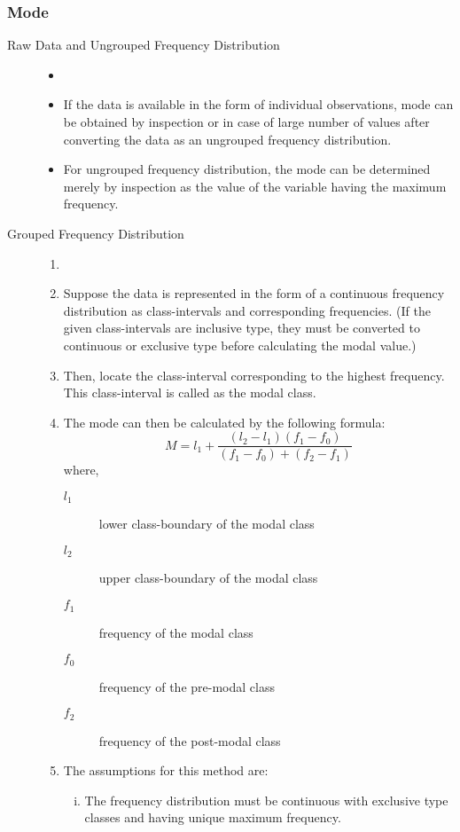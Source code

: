 \documentclass[
10pt, %
a4paper, %
]{report}
\begin{document}
\subsubsection*{Mode}
\begin{description}
\item[Raw Data and Ungrouped Frequency Distribution]
\begin{itemize}
\item[]
\item If the data is available in the form of individual observations, mode can be obtained by inspection or in case of large number of values after converting the data as an ungrouped frequency distribution.
\item For ungrouped frequency distribution, the mode can be determined merely by inspection as the value of the variable having the maximum frequency.
\end{itemize}
\item[Grouped Frequency Distribution]
\begin{enumerate}[Step 1.]
\item[]
\item Suppose the data is represented in the form of a continuous frequency distribution as class-intervals and corresponding frequencies. (If the given class-intervals are inclusive type, they must be converted to continuous or exclusive type before calculating the modal value.)
\item Then, locate the class-interval corresponding to the highest frequency. This class-interval is called as the modal class.
\item The mode can then be calculated by the following formula:
\[
M = l_1 + \frac{(l_2 - l_1)(f_1 - f_0)}{(f_1-f_0)+(f_2-f_1)}
\]
where,
\begin{description}
\item[\(l_1\)] lower class-boundary of the modal class
\item[\(l_2\)] upper class-boundary of the modal class
\item[\(f_1\)] frequency of the modal class
\item[\(f_0\)] frequency of the pre-modal class
\item[\(f_2\)] frequency of the post-modal class
\end{description}
\item The assumptions for this method are:
\begin{enumerate}[i.]
\item The frequency distribution must be continuous with exclusive type classes and having unique maximum frequency.

\end{enumerate}
\end{enumerate}
\end{description}
\end{document}
